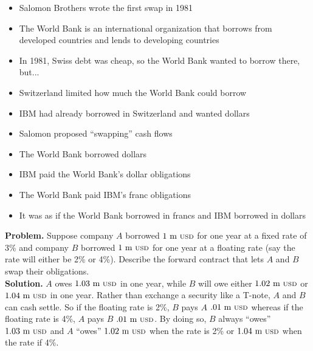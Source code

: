 \documentclass{beamer}
\begin{document}
\begin{frame}{}
    \begin{itemize}
        \item Salomon Brothers wrote the first swap in 1981
        \item The World Bank is an international organization that borrows from developed countries and lends to developing countries
        \item In 1981, Swiss debt was cheap, so the World Bank wanted to borrow there, but...
        \item Switzerland limited how much the World Bank could borrow
        \item IBM had already borrowed in Switzerland and wanted dollars
        \item Salomon proposed ``swapping'' cash flows
        \item The World Bank borrowed dollars
        \item IBM paid the World Bank's dollar obligations
        \item The World Bank paid IBM's franc obligations
        \item It was as if the World Bank borrowed in francs and IBM borrowed in dollars
    \end{itemize}
\end{frame}

\begin{frame}{}
	\textbf{Problem.} Suppose company $A$ borrowed $1\text{ m {\scriptsize USD}}$ for one year at a fixed rate of 3\% and company $B$ borrowed $1\text{ m {\scriptsize USD}}$ for one year at a floating rate (say the rate will either be 2\% or 4\%). Describe the forward contract that lets $A$ and $B$ swap their obligations.\\
	\vfill
	\textbf{Solution.} $A$ owes $1.03\text{ m {\scriptsize USD}}$ in one year, while $B$ will owe either $1.02\text{ m {\scriptsize USD}}$ or $1.04\text{ m {\scriptsize USD}}$ in one year. Rather than exchange a security like a T-note, $A$ and $B$ can cash settle. So if the floating rate is 2\%, $B$ pays $A$ $.01\text{ m {\scriptsize USD}}$ whereas if the floating rate is 4\%, $A$ pays $B$ $.01\text{ m {\scriptsize USD}}$. By doing so, $B$ always ``owes'' $1.03\text{ m {\scriptsize USD}}$ and $A$ ``owes'' $1.02\text{ m {\scriptsize USD}}$ when the rate is 2\% or $1.04\text{ m {\scriptsize USD}}$ when the rate if 4\%.
\end{frame}
\end{document}

